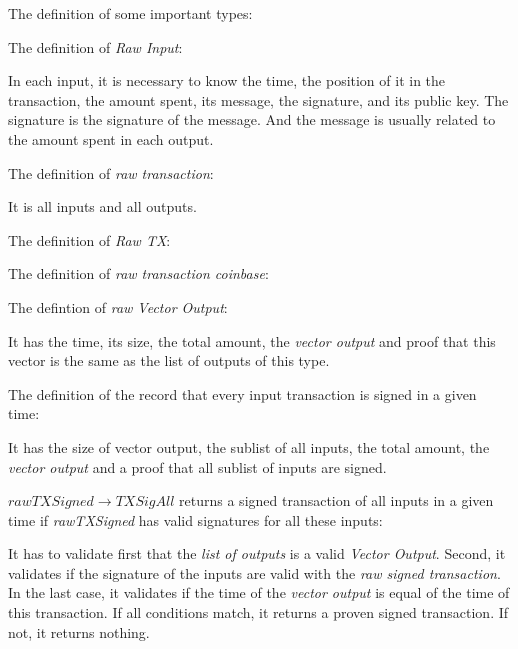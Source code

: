 The definition of some important types:


The definition of \emph{Raw Input}:


In each input, it is necessary to know the time, the position of it in the transaction,
the amount spent, its message, the signature, and its public key.
The signature is the signature of the message.
And the message is usually related to the amount spent in each output.

The definition of \emph{raw transaction}:


It is all inputs and all outputs.

The definition of \emph{Raw TX}:


The definition of \emph{raw transaction coinbase}:


The defintion of \emph{raw Vector Output}: 


It has the time, its size, the total amount, the \emph{vector output}
and proof that this vector is the same as the list of outputs of this type.

The definition of the record that every input transaction is signed in a given time:


It has the size of vector output, the sublist of all inputs, the total amount,
the \emph{vector output} and a proof that all sublist of inputs are signed.

$rawTXSigned \to TXSigAll$ returns a signed transaction of all inputs in a given time
if \emph{rawTXSigned} has valid signatures for all these inputs:


It has to validate first that the \emph{list of outputs} is a valid \emph{Vector Output}.
Second, it validates if the signature of the inputs are valid with the
\emph{raw signed transaction}.
In the last case, it validates if the time of the \emph{vector output} is equal
of the time of this transaction.
If all conditions match, it returns a proven signed transaction.
If not, it returns nothing.

